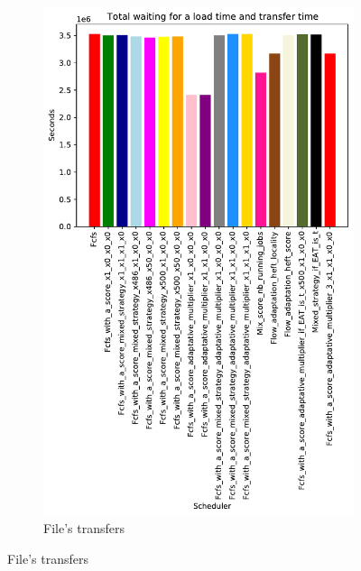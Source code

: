\documentclass[a4paper]{article}
\begin{document}
\begin{figure}[H]
\begin{subfigure}[b]{0.4\linewidth}\centering\includegraphics[width=0.9\linewidth]{MBSS/plot/Results_FCFS_Score_Adaptative_Multiplier_2022-02-02->2022-02-03_V9271_Total_waiting_for_a_load_time_and_transfer_time_450_128_32_256_4_1024.pdf}\caption{File's transfers}\end{subfigure}

\end{figure}
\end{document}
